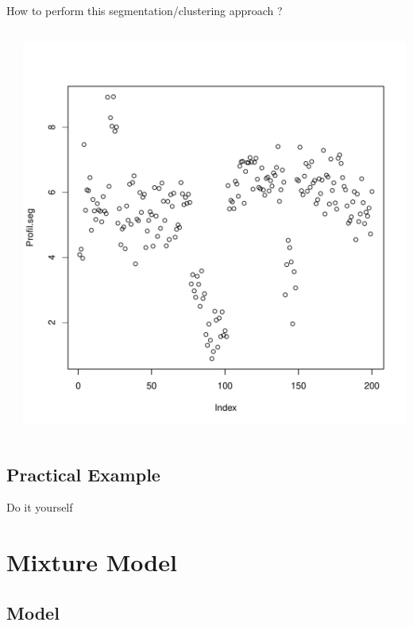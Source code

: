 \documentclass{beamer}\usepackage[]{graphicx}\usepackage[]{color}
\makeatletter
\newenvironment{kframe}{%
 \def\at@end@of@kframe{}%
 \ifinner\ifhmode%
  \def\at@end@of@kframe{\end{minipage}}%
  \begin{minipage}{\columnwidth}%
 \fi\fi%
 \def\FrameCommand##1{\hskip\@totalleftmargin \hskip-\fboxsep
 \colorbox{shadecolor}{##1}\hskip-\fboxsep
     \hskip-\linewidth \hskip-\@totalleftmargin \hskip\columnwidth}%
 \MakeFramed {\advance\hsize-\width
   \@totalleftmargin\z@ \linewidth\hsize
   \@setminipage}}%
 {\par\unskip\endMakeFramed%
 \at@end@of@kframe}
\newenvironment{knitrout}{}{} %
\makeatother
\begin{document}
\begin{frame}[fragile]{How to perform this segmentation/clustering approach ?}
\begin{columns}
\begin{column}{0.4\textwidth}
\begin{knitrout}
\begin{kframe}
{\ttfamily\noindent\bfseries{}}\end{kframe}
\end{knitrout}
\end{column}
\begin{column}{0.5\textwidth}
\includegraphics[scale=0.35]{segCode4-1.pdf}
\end{column}
\end{columns}
\end{frame}

\subsection*{Practical Example}
\begin{frame}[fragile]{Do it yourself}
\end{frame}
\section{Mixture Model}

\subsection*{Model}
\end{document}
